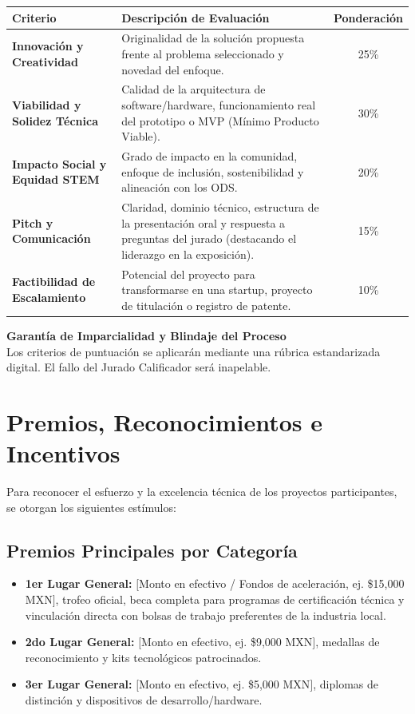 \documentclass[11pt,letterpaper]{article}
\newcommand{\infotitle}[1]{\textbf{\color{ieeeblue}#1}\\[3pt]}
\begin{document}
\begin{center}
\begin{tabularx}{\textwidth}{@{}p{4.5cm} X c@{}}
\toprule
\textbf{Criterio} & \textbf{Descripción de Evaluación} & \textbf{Ponderación} \\
\midrule
\textbf{Innovación y Creatividad} & Originalidad de la solución propuesta frente al problema seleccionado y novedad del enfoque. & 25\% \\
\midrule
\textbf{Viabilidad y Solidez Técnica} & Calidad de la arquitectura de software/hardware, funcionamiento real del prototipo o MVP (Mínimo Producto Viable). & 30\% \\
\midrule
\textbf{Impacto Social y Equidad STEM} & Grado de impacto en la comunidad, enfoque de inclusión, sostenibilidad y alineación con los ODS. & 20\% \\
\midrule
\textbf{Pitch y Comunicación} & Claridad, dominio técnico, estructura de la presentación oral y respuesta a preguntas del jurado (destacando el liderazgo en la exposición). & 15\% \\
\midrule
\textbf{Factibilidad de Escalamiento} & Potencial del proyecto para transformarse en una startup, proyecto de titulación o registro de patente. & 10\% \\
\bottomrule
\end{tabularx}
\end{center}

\begin{infobox}
\infotitle{Garantía de Imparcialidad y Blindaje del Proceso}
Los criterios de puntuación se aplicarán mediante una rúbrica estandarizada digital. El fallo del Jurado Calificador será inapelable.
\end{infobox}

\section{Premios, Reconocimientos e Incentivos}

Para reconocer el esfuerzo y la excelencia técnica de los proyectos participantes, se otorgan los siguientes estímulos:

\subsection{Premios Principales por Categoría}
\begin{itemize}
    \item \textbf{1er Lugar General:} $[$Monto en efectivo / Fondos de aceleración, ej. \$15,000 MXN$]$, trofeo oficial, beca completa para programas de certificación técnica y vinculación directa con bolsas de trabajo preferentes de la industria local.
    \item \textbf{2do Lugar General:} $[$Monto en efectivo, ej. \$9,000 MXN$]$, medallas de reconocimiento y kits tecnológicos patrocinados.
    \item \textbf{3er Lugar General:} $[$Monto en efectivo, ej. \$5,000 MXN$]$, diplomas de distinción y dispositivos de desarrollo/hardware.
\end{itemize}
\end{document}
